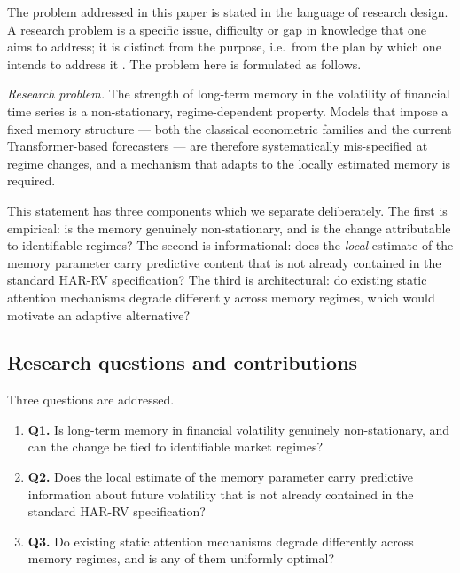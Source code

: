 \documentclass[journal]{IEEEtran}
\begin{document}
The problem addressed in this paper is stated in the language of research design. A research
problem is a specific issue, difficulty or gap in knowledge that one aims to address; it is
distinct from the purpose, i.e.\ from the plan by which one intends to address it
\cite{cherenda2020research}. The problem here is formulated as follows.

\emph{Research problem.} The strength of long-term memory in the volatility of financial time
series is a non-stationary, regime-dependent property. Models that impose a fixed memory
structure --- both the classical econometric families and the current Transformer-based
forecasters --- are therefore systematically mis-specified at regime changes, and a mechanism
that adapts to the locally estimated memory is required.

This statement has three components which we separate deliberately. The first is empirical: is the
memory genuinely non-stationary, and is the change attributable to identifiable regimes? The
second is informational: does the \emph{local} estimate of the memory parameter carry predictive
content that is not already contained in the standard HAR-RV specification? The third is
architectural: do existing static attention mechanisms degrade differently across memory regimes,
which would motivate an adaptive alternative?

\subsection{Research questions and contributions}

Three questions are addressed.

\begin{enumerate}
\item \textbf{Q1.} Is long-term memory in financial volatility genuinely non-stationary, and can
the change be tied to identifiable market regimes?
\item \textbf{Q2.} Does the local estimate of the memory parameter carry predictive information
about future volatility that is not already contained in the standard HAR-RV specification?
\item \textbf{Q3.} Do existing static attention mechanisms degrade differently across memory
regimes, and is any of them uniformly optimal?
\end{enumerate}
\end{document}
